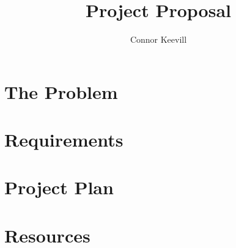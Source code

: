 \documentclass[11pt]{article}
\title{
	{Project Proposal}
}
\author{Connor Keevill}
\begin{document}
	\maketitle

	\pagebreak
	\tableofcontents
	\pagebreak

	\section[Problem]{The Problem}\label{sec:the-problem}
	

	\section{Requirements}\label{sec:requirements}
	

	\section{Project Plan}\label{sec:project-plan}
	

	\section{Resources}\label{sec:resources}
	
\end{document}
